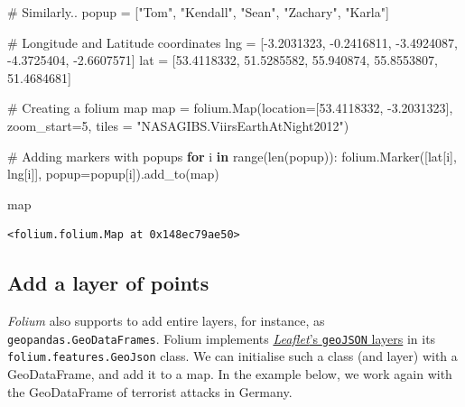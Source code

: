 \documentclass[
  letterpaper,
  DIV=11,
  numbers=noendperiod]{scrreprt}
\newenvironment{Shaded}{\begin{snugshade}}{\end{snugshade}}
\newcommand{\BuiltInTok}[1]{\textcolor[rgb]{0.00,0.23,0.31}{#1}}
\newcommand{\CommentTok}[1]{\textcolor[rgb]{0.37,0.37,0.37}{#1}}
\newcommand{\ControlFlowTok}[1]{\textcolor[rgb]{0.00,0.23,0.31}{\textbf{#1}}}
\newcommand{\DecValTok}[1]{\textcolor[rgb]{0.68,0.00,0.00}{#1}}
\newcommand{\FloatTok}[1]{\textcolor[rgb]{0.68,0.00,0.00}{#1}}
\newcommand{\KeywordTok}[1]{\textcolor[rgb]{0.00,0.23,0.31}{\textbf{#1}}}
\newcommand{\NormalTok}[1]{\textcolor[rgb]{0.00,0.23,0.31}{#1}}
\newcommand{\OperatorTok}[1]{\textcolor[rgb]{0.37,0.37,0.37}{#1}}
\newcommand{\StringTok}[1]{\textcolor[rgb]{0.13,0.47,0.30}{#1}}
\begin{document}
\begin{Shaded}
\begin{Highlighting}[]
\CommentTok{\# Similarly..}
\NormalTok{popup }\OperatorTok{=}\NormalTok{ [}\StringTok{"Tom"}\NormalTok{, }\StringTok{"Kendall"}\NormalTok{, }\StringTok{"Sean"}\NormalTok{, }\StringTok{"Zachary"}\NormalTok{, }\StringTok{"Karla"}\NormalTok{]}

\CommentTok{\# Longitude and Latitude coordinates}
\NormalTok{lng }\OperatorTok{=}\NormalTok{ [}\OperatorTok{{-}}\FloatTok{3.2031323}\NormalTok{, }\OperatorTok{{-}}\FloatTok{0.2416811}\NormalTok{, }\OperatorTok{{-}}\FloatTok{3.4924087}\NormalTok{, }\OperatorTok{{-}}\FloatTok{4.3725404}\NormalTok{, }\OperatorTok{{-}}\FloatTok{2.6607571}\NormalTok{]}
\NormalTok{lat }\OperatorTok{=}\NormalTok{ [}\FloatTok{53.4118332}\NormalTok{, }\FloatTok{51.5285582}\NormalTok{, }\FloatTok{55.940874}\NormalTok{, }\FloatTok{55.8553807}\NormalTok{, }\FloatTok{51.4684681}\NormalTok{]}

\CommentTok{\# Creating a folium map}
\BuiltInTok{map} \OperatorTok{=}\NormalTok{ folium.Map(location}\OperatorTok{=}\NormalTok{[}\FloatTok{53.4118332}\NormalTok{, }\OperatorTok{{-}}\FloatTok{3.2031323}\NormalTok{], zoom\_start}\OperatorTok{=}\DecValTok{5}\NormalTok{, tiles }\OperatorTok{=} \StringTok{"NASAGIBS.ViirsEarthAtNight2012"}\NormalTok{)}

\CommentTok{\# Adding markers with popups}
\ControlFlowTok{for}\NormalTok{ i }\KeywordTok{in} \BuiltInTok{range}\NormalTok{(}\BuiltInTok{len}\NormalTok{(popup)):}
\NormalTok{    folium.Marker([lat[i], lng[i]], popup}\OperatorTok{=}\NormalTok{popup[i]).add\_to(}\BuiltInTok{map}\NormalTok{)}

\BuiltInTok{map}
\end{Highlighting}
\end{Shaded}

\begin{verbatim}
<folium.folium.Map at 0x148ec79ae50>
\end{verbatim}

\subsection{Add a layer of points}\label{add-a-layer-of-points}

\emph{Folium} also supports to add entire layers, for instance, as
\texttt{geopandas.GeoDataFrames}. Folium implements
\href{https://leafletjs.com/reference.html\#geojson}{\emph{Leaflet}'s
\texttt{geoJSON} layers} in its \texttt{folium.features.GeoJson} class.
We can initialise such a class (and layer) with a GeoDataFrame, and add
it to a map. In the example below, we work again with the GeoDataFrame
of terrorist attacks in Germany.
\end{document}
